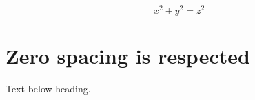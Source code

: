 \documentclass{article}
\begin{document}
\begin{equation}x^2+y^2=z^2\end{equation}
\section{Zero spacing is respected}
Text below heading.
\end{document}
